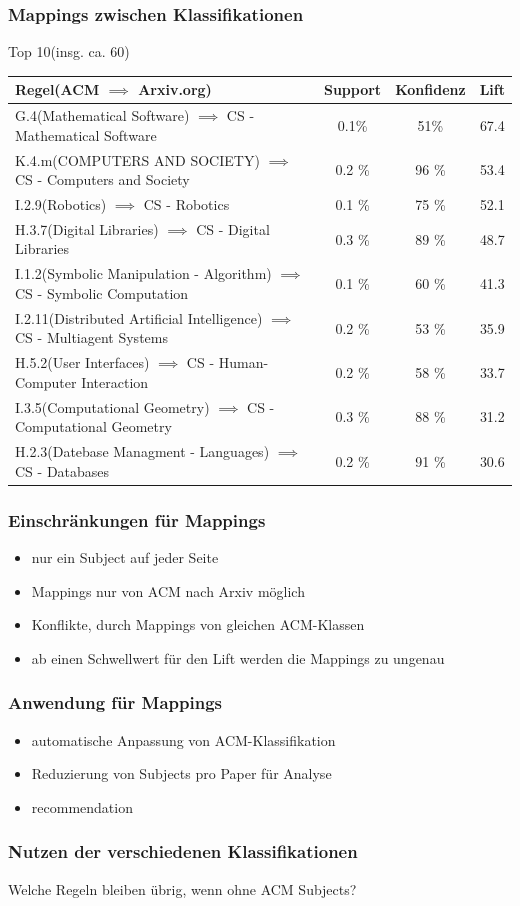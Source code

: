 \documentclass[12pt, xcolor=table]{beamer}
\begin{document}
\begin{frame}
	\frametitle{Mappings zwischen Klassifikationen}
	Top 10(insg. ca. 60)
	\begin{tabular}{lccc}
		\tiny\textbf{Regel(ACM $\implies$ Arxiv.org)} &\tiny \textbf{Support} &\tiny \textbf{Konfidenz} & \tiny \textbf{Lift}\\
		\hline
		\tiny G.4(Mathematical Software) $\implies$ CS - Mathematical Software & \tiny 0.1\% &\tiny 51\% &\tiny 67.4  \\
		\tiny K.4.m(COMPUTERS AND SOCIETY) $\implies$ CS - Computers and Society &\tiny 0.2 \% &\tiny 96 \%  &\tiny 53.4 \\
		\tiny I.2.9(Robotics) $\implies$ CS - Robotics &\tiny 0.1 \% &\tiny 75 \%  &\tiny 52.1 \\
		\tiny H.3.7(Digital Libraries) $\implies$ CS - Digital Libraries &\tiny 0.3 \% &\tiny 89 \% &\tiny 48.7 \\
		\tiny I.1.2(Symbolic Manipulation - Algorithm) $\implies$ CS - Symbolic Computation  &\tiny 0.1 \% &\tiny 60 \%  &\tiny 41.3 \\
		\tiny I.2.11(Distributed Artificial Intelligence) $\implies$ CS - Multiagent Systems  &\tiny 0.2 \% &\tiny 53 \%  &\tiny 35.9 \\
		\tiny H.5.2(User Interfaces) $\implies$ CS - Human-Computer Interaction &\tiny 0.2 \% &\tiny 58 \%  &\tiny 33.7 \\
		\tiny I.3.5(Computational Geometry) $\implies$ CS - Computational Geometry &\tiny 0.3 \% &\tiny 88 \%  &\tiny 31.2 \\
		\tiny H.2.3(Datebase Managment - Languages) $\implies$ CS - Databases &\tiny 0.2 \% &\tiny 91 \%  &\tiny 30.6 \\
	\end{tabular}
\end{frame}
\begin{frame}
	\frametitle{Einschränkungen für Mappings}
    \begin{itemize}
	\item nur ein Subject auf jeder Seite
	\item Mappings nur von ACM nach Arxiv möglich
	\item Konflikte, durch Mappings von gleichen ACM-Klassen
	\item ab einen Schwellwert für den Lift werden die Mappings zu ungenau 
    \end{itemize}
\end{frame}
\begin{frame}
	\frametitle{Anwendung für Mappings}
    \begin{itemize}
	\item automatische Anpassung von ACM-Klassifikation 
	\item Reduzierung von Subjects pro Paper für Analyse
	\item recommendation 
    \end{itemize}
\end{frame}
\begin{frame}
	\frametitle{Nutzen der verschiedenen Klassifikationen}
    Welche Regeln bleiben übrig, wenn ohne ACM Subjects?\\
\end{frame}
\end{document}
